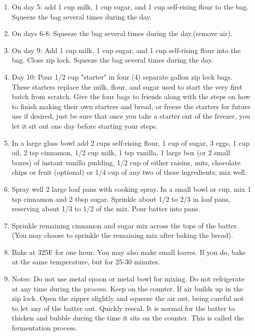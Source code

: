 \documentclass[11pt, twoside, openany]{book}
\begin{document}
\begin{minipage}[t]{\linewidth}
\begin{enumerate}
\item On day 5: add 1 cup milk, 1 cup sugar, and 1 cup self-rising flour to the bag. Squeeze the bag several times during the day.
\item On days 6-8: Squeeze the bag several times during the day.(remove air).
\item On day 9: Add 1 cup milk, 1 cup sugar, and 1 cup self-rising flour into the bag. Close zip lock. Squeeze the bag several times during the day.
\item Day 10: Pour 1/2 cup "starter" in four (4) separate gallon zip lock bags. These starters replace the milk, flour, and sugar used to start the very first batch from scratch. Give the four bags to friends along with the steps on how to finish making their own starters and bread, or freeze the starters for future use if desired, just be sure that once you take a starter out of the freezer, you let it sit out one day before starting your steps.
\item In a large glass bowl add 2 cups self-rising flour, 1 cup of sugar, 3 eggs, 1 cup oil, 2 tsp cinnamon, 1/2 cup milk, 1 tsp vanilla, 1 large box (or 2 small boxes) of instant vanilla pudding, 1/2 cup of either raisins, nuts, chocolate chips or fruit (optional) or 1/4 cup of any two of these ingredients; mix well.
\item Spray well 2 large loaf pans with cooking spray. In a small bowl or cup, mix 1 tsp cinnamon and 2 tbsp sugar. Sprinkle about 1/2 to 2/3 in loaf pans, reserving about 1/3 to 1/2 of the mix. Pour batter into pans.
\item Sprinkle remaining cinnamon and sugar mix across the tops of the batter. (You may choose to sprinkle the remaining mix after baking the bread).
\item Bake at 325F for one hour. You may also make small loaves. If you do, bake at the same temperature, but for 25-30 minutes.
\item Notes: Do not use metal spoon or metal bowl for mixing. Do not refrigerate at any time during the process. Keep on the counter. If air builds up in the zip lock. Open the zipper slightly and squeeze the air out, being careful not to let any of the batter out. Quickly reseal. It is normal for the batter to thicken and bubble during the time it sits on the counter. This is called the fermentation process.
\end{enumerate}
\end{minipage}\vspace{8mm}
\end{document}
